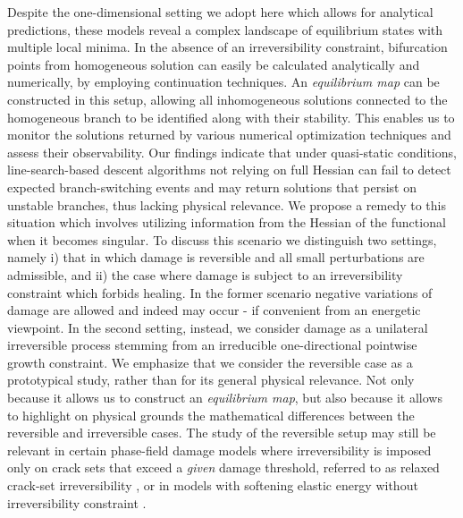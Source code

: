 Despite the one-dimensional setting we adopt here which allows for analytical predictions, these models reveal a complex landscape of equilibrium states with multiple local minima.
In the absence of an irreversibility constraint, bifurcation points from homogeneous solution can easily be calculated analytically and numerically, by employing continuation techniques.
An \emph{equilibrium map} can be constructed in this setup, allowing all  {inhomogeneous} solutions connected to the homogeneous branch to be identified along with their stability. This enables us to monitor the solutions returned by various numerical optimization techniques and assess their observability.
 Our findings indicate that under quasi-static conditions, line-search-based descent algorithms not relying on full Hessian can fail to detect expected branch-switching events and may return solutions that persist on unstable branches, thus lacking physical relevance. 
We propose a remedy to this situation which involves utilizing information from the Hessian of the functional when it becomes singular. 
To discuss this scenario we distinguish two settings, namely i) that in which damage is reversible and all small perturbations are admissible, and ii) the case where damage is subject to an irreversibility constraint which forbids healing. In the former scenario  negative variations of damage are allowed and indeed may occur - if convenient from an energetic viewpoint. In the second setting, instead, we consider damage as a unilateral irreversible process stemming from an irreducible one-directional pointwise growth constraint.
{We emphasize that we consider the reversible case as a prototypical study, rather than for its general physical relevance. Not only because it allows us to construct an \emph{equilibrium map}, but also because it allows to highlight on physical grounds the mathematical differences between the reversible and irreversible cases. The study of the reversible setup may still be relevant in certain phase-field damage models where irreversibility is imposed only on crack sets that exceed a \emph{given} damage threshold, referred to as relaxed crack-set irreversibility \cite{Bourdin2000-pc, Kumar2020-xz, De-Lorenzis2020-rz}, or in models with softening elastic energy without irreversibility constraint \cite{Truskinovsky2010-st,Salman2021-mn,Baggio2023-yo}.}



